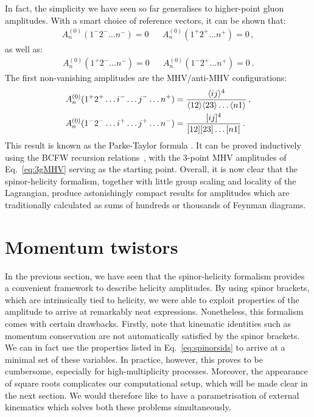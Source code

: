 \documentclass[main.tex]{subfiles}
\begin{document}
In fact, the simplicity we have seen so far generalises to higher-point gluon amplitudes. With a smart choice of reference vectors, it can be shown that:
\begin{align}
    A_n^{(0)} (1^-2^- \ldots n^-) = 0 && A_n^{(0)} (1^+2^+ \ldots n^+) = 0\,,
\end{align}
as well as:
\begin{align}
    A_n^{(0)} (1^+2^- \ldots n^-) = 0 && A_n^{(0)} (1^-2^+ \ldots n^+) = 0\,.
\end{align}
The first non-vanishing amplitudes are the MHV/anti-MHV configurations:
\begin{align} \label{eq:ParkeTaylor}
    A_n^{(0)} (1^+2^+\ldots i^- \ldots j^- \ldots n^+) &= \frac{\langle ij \rangle^4}{\langle 12 \rangle \langle 23 \rangle \ldots \langle n1 \rangle} \,, \\
    A_n^{(0)} (1^-2^-\ldots i^+ \ldots j^+ \ldots n^-) &= \frac{[ ij ]^4}{[ 12 ] [ 23 ] \ldots [ n1 ]} \,.
\end{align}
This result is known as the Parke-Taylor formula \cite{Mangano:1990by}. It can be proved inductively using the BCFW recursion relations~\cite{Britto:2004ap, Britto:2005fq}, with the 3-point MHV amplitudes of Eq.~\ref{eq:3gMHV} serving as the starting point. Overall, it is now clear that the spinor-helicity formalism, together with little group scaling and locality of the Lagrangian, produce astonishingly compact results for amplitudes which are traditionally calculated as sums of hundreds or thousands of Feynman diagrams.
\section{Momentum twistors} \label{sec:MTs}
In the previous section, we have seen that the spinor-helicity formalism provides a convenient framework to describe helicity amplitudes. By using spinor brackets, which are intrinsically tied to helicity, we were able to exploit properties of the amplitude to arrive at remarkably neat expressions. Nonetheless, this formalism comes with certain drawbacks. Firstly, note that kinematic identities such as momentum conservation are not automatically satisfied by the spinor brackets. We can in fact use the properties listed in Eq.~\ref{eq:spinorsids} to arrive at a minimal set of these variables. In practice, however, this proves to be cumbersome, especially for high-multiplicity processes. Moreover, the appearance of square roots 
complicates our computational setup, which will be made clear in the next section. We would therefore like to have a parametrisation of external kinematics which solves both these problems simultaneously.
\end{document}

